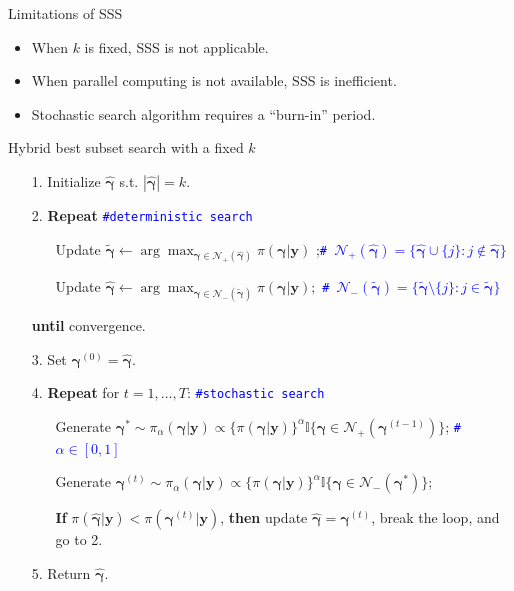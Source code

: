 \documentclass[citecolor=blue,10pt]{beamer}
\def\bg{{\boldsymbol \gamma}}
\newcommand{\0} {\mbox{\boldmath$0$}}
\newcommand{\uy}{{\boldsymbol y}}
\begin{document}
\begin{frame}{Limitations of SSS}
\begin{itemize}\itemsep=3mm
\item When $k$ is fixed, SSS is not applicable.
\item When parallel computing is not available, SSS is inefficient.
\item Stochastic search algorithm requires a ``burn-in'' period.
\end{itemize}
\end{frame}


\begin{frame}{Hybrid best subset search with a fixed $k$}
\begin{itemize}
  \item[1.] Initialize $\hat{\bg}$ s.t. $|\hat{\bg}|=k$.
  \item[2.] \textbf{Repeat} \quad  \texttt{\textcolor{blue}{\#deterministic search}}
        \begin{itemize}\itemsep=2mm
         \item[] Update $\tilde{\bg }\leftarrow \arg\max_{\bg  \in \mathcal{N}_+(\hat{\bg} ) } \pi(\bg|\uy)$ ;\quad  \texttt{\textcolor{blue}{\# $\mathcal{N}_+(\hat{\bg})=\{\hat{\bg} \cup \{j\}: j\notin \hat{\bg} \}$}}
         \item[] Update $\hat{\bg}\leftarrow  \arg\max_{\bg  \in \mathcal{N}_-(\tilde{\bg} ) } \pi(\bg|\uy);$ \quad \texttt{\textcolor{blue}{\# $\mathcal{N}_-(\tilde{\bg })= \{\tilde{\bg } \setminus \{j\}: j\in \tilde{\bg } \}$}}
        \end{itemize}
  \item[] \textbf{until} convergence.
 \pause \item[3.] Set $\bg^{(0)}=\hat{\bg}$.
  \item[4.] \textbf{Repeat} for $t=1,\ldots,T$:  \quad  \texttt{\textcolor{blue}{\#stochastic search}}
        \begin{itemize}\itemsep=2mm
         \item[] Generate $\bg^* \sim\pi_\alpha (\bg |\uy)\propto  \{\pi(\bg |\uy)\}^\alpha \mathbb{I}\{\bg\in \mathcal{N}_+({\bg^{(t-1)}} ) \}$;  \quad  \texttt{\textcolor{blue}{\# $\alpha \in [0,1]$}}
         \item[] Generate $\bg^{(t)}\sim \pi_\alpha (\bg |\uy)\propto \{\pi(\bg |\uy)\}^\alpha \mathbb{I}\{\bg\in \mathcal{N}_-({\bg^{*}} ) \}$;
         \item[] \textbf{If} $\pi(\hat{\bg} |\uy)<\pi({\bg}^{(t)} |\uy)$, \textbf{then} update $\hat{\bg}=\bg^{(t)}$, break the loop, and go to 2.
        \end{itemize}
  \item[5.] Return $\hat{\bg}$.
 \end{itemize}
\end{frame}
\end{document}
